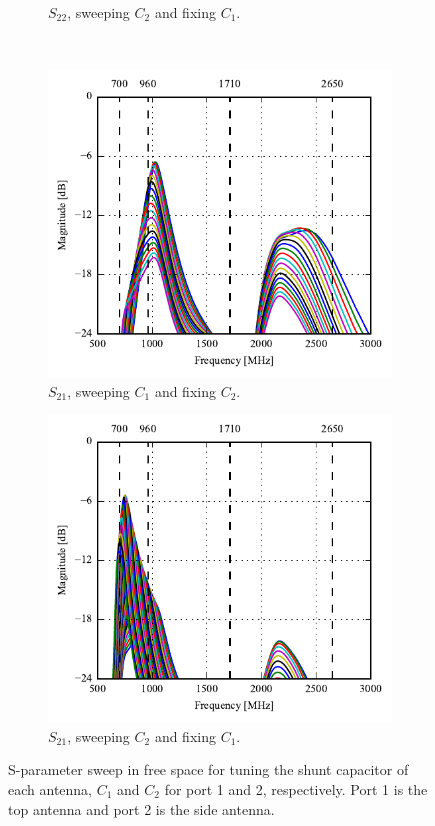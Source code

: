 \begin{figure}[htbp]
\begin{subfigure}[b]{0.49\linewidth}
        \caption{$S_{22}$, sweeping $C_2$ and fixing $C_1$.}
    \end{subfigure}
~
    \begin{subfigure}[b]{0.49\linewidth}
        \centering
        \includegraphics{img/tech_sol/monopole/5mm/sim/sweep_s11_s21}
        \caption{$S_{21}$, sweeping $C_1$ and fixing $C_2$.}
    \end{subfigure}
    \hfill
    \begin{subfigure}[b]{0.49\linewidth}
        \centering
        \includegraphics{img/tech_sol/monopole/5mm/sim/sweep_s22_s21_12p}
        \caption{$S_{21}$, sweeping $C_2$ and fixing $C_1$.}
    \end{subfigure}
    \caption{S-parameter sweep in free space for tuning the shunt capacitor of each antenna, $C_1$ and $C_2$ for port 1 and 2, respectively. Port 1 is the top antenna and port 2 is the side antenna.}
    \label{fig:sparam_mono_6pf_free_space}
\end{figure}

